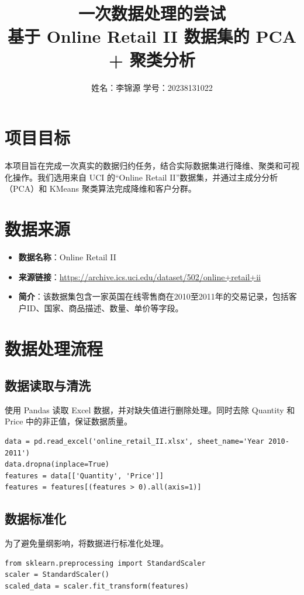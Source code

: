 \documentclass[10pt]{ctexart}
\title{\textbf{一次数据处理的尝试}\\[0.5em]
\Large 基于 Online Retail II 数据集的 PCA + 聚类分析}
\author{姓名：李锦源 \quad 学号：20238131022}
\date{}
\begin{document}
\maketitle

\section{项目目标}
本项目旨在完成一次真实的数据归约任务，结合实际数据集进行降维、聚类和可视化操作。我们选用来自 UCI 的“Online Retail II”数据集，并通过主成分分析（PCA）和 KMeans 聚类算法完成降维和客户分群。

\section{数据来源}
\begin{itemize}
    \item \textbf{数据名称}：Online Retail II
    \item \textbf{来源链接}：\url{https://archive.ics.uci.edu/dataset/502/online+retail+ii}
    \item \textbf{简介}：该数据集包含一家英国在线零售商在2010至2011年的交易记录，包括客户ID、国家、商品描述、数量、单价等字段。
\end{itemize}

\section{数据处理流程}

\subsection{数据读取与清洗}
使用 Pandas 读取 Excel 数据，并对缺失值进行删除处理。同时去除 Quantity 和 Price 中的非正值，保证数据质量。

\begin{lstlisting}
data = pd.read_excel('online_retail_II.xlsx', sheet_name='Year 2010-2011')
data.dropna(inplace=True)
features = data[['Quantity', 'Price']]
features = features[(features > 0).all(axis=1)]
\end{lstlisting}

\subsection{数据标准化}
为了避免量纲影响，将数据进行标准化处理。

\begin{lstlisting}
from sklearn.preprocessing import StandardScaler
scaler = StandardScaler()
scaled_data = scaler.fit_transform(features)
\end{lstlisting}
\end{document}

